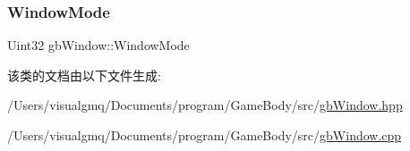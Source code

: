 \mbox{\label{classgb_window_a60b7748425bf49fdf563c870a13c6e07}} 
\subsubsection{\texorpdfstring{WindowMode}{WindowMode}}
{\footnotesize\ttfamily Uint32 gb\+Window\+::\+Window\+Mode\hspace{0.3cm}{\ttfamily [protected]}}



该类的文档由以下文件生成\+:\begin{DoxyCompactItemize}
\item 
/\+Users/visualgmq/\+Documents/program/\+Game\+Body/src/\mbox{\hyperlink{gb_window_8hpp}{gb\+Window.\+hpp}}\item 
/\+Users/visualgmq/\+Documents/program/\+Game\+Body/src/\mbox{\hyperlink{gb_window_8cpp}{gb\+Window.\+cpp}}\end{DoxyCompactItemize}
